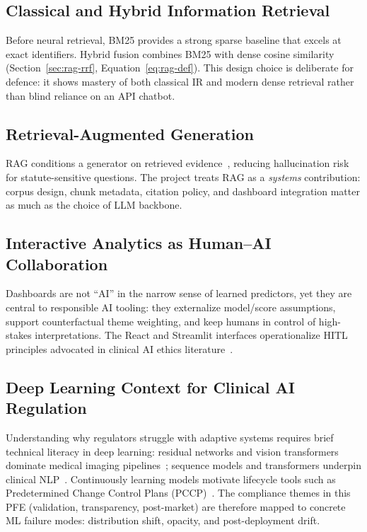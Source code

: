 \subsection{Classical and Hybrid Information Retrieval}
\label{sec:ai-ir}

Before neural retrieval, BM25 provides a strong sparse baseline that excels at exact
identifiers. Hybrid fusion combines BM25 with dense cosine similarity
(Section~\ref{sec:rag-rrf}, Equation~\eqref{eq:rag-def}). This design choice is deliberate for
defence: it shows mastery of both classical IR and modern dense retrieval rather than
blind reliance on an API chatbot.

\subsection{Retrieval-Augmented Generation}
\label{sec:ai-rag-brief}

RAG conditions a generator on retrieved evidence~\cite{lewis2020rag}, reducing
hallucination risk for statute-sensitive questions. The project treats RAG as a
\emph{systems} contribution: corpus design, chunk metadata, citation policy, and
dashboard integration matter as much as the choice of LLM backbone.

\subsection{Interactive Analytics as Human--AI Collaboration}
\label{sec:ai-hci}

Dashboards are not ``AI'' in the narrow sense of learned predictors, yet they are
central to responsible AI tooling: they externalize model/score assumptions, support
counterfactual theme weighting, and keep humans in control of high-stakes interpretations.
The React and Streamlit interfaces operationalize HITL principles advocated in clinical
AI ethics literature~\cite{char2018,mittelstadt2019}.

\subsection{Deep Learning Context for Clinical AI Regulation}
\label{sec:ai-clinical-dl}

Understanding why regulators struggle with adaptive systems requires brief technical
literacy in deep learning: residual networks and vision transformers dominate medical
imaging pipelines~\cite{he2016,dosovitskiy2021,litjens2017}; sequence models and
transformers underpin clinical NLP~\cite{vaswani2017,devlin2019}. Continuously learning
models motivate lifecycle tools such as Predetermined Change Control Plans
(PCCP)~\cite{fda2023,babic2019,hwang2019}. The compliance themes in this PFE
(validation, transparency, post-market) are therefore mapped to concrete ML failure
modes: distribution shift, opacity, and post-deployment drift.

